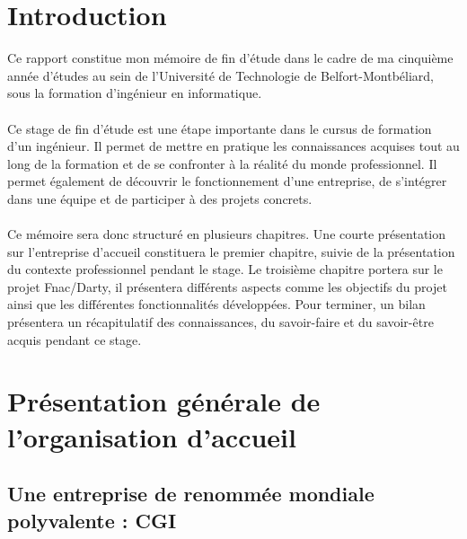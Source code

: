 \documentclass[12pt, a4paper]{report}
\begin{document}
	\chapter*{Introduction}
	Ce rapport constitue mon mémoire de fin d'étude dans le cadre de ma cinquième année d'études au sein de l'Université de Technologie de Belfort-Montbéliard, sous la formation d'ingénieur en informatique.
	\\\\
	Ce stage de fin d'étude est une étape importante dans le cursus de formation d'un ingénieur. Il permet de mettre en pratique les connaissances acquises tout au long de la formation et de se confronter à la réalité du monde professionnel. Il permet également de découvrir le fonctionnement d'une entreprise, de s'intégrer dans une équipe et de participer à des projets concrets.
	\\\\
	Ce mémoire sera donc structuré en plusieurs chapitres. Une courte présentation sur l'entreprise d'accueil constituera le premier chapitre, suivie de la présentation du contexte professionnel pendant le stage. Le troisième chapitre portera sur le projet Fnac/Darty, il présentera différents aspects comme les objectifs du projet ainsi que les différentes fonctionnalités développées. Pour terminer, un bilan présentera un récapitulatif des connaissances, du savoir-faire et du savoir-être acquis pendant ce stage.

	\newpage

	\tableofcontents
	\listoffigures

	\chapter{Présentation générale de l'organisation d'accueil}
	\section{Une entreprise de renommée mondiale polyvalente : CGI}
\end{document}
